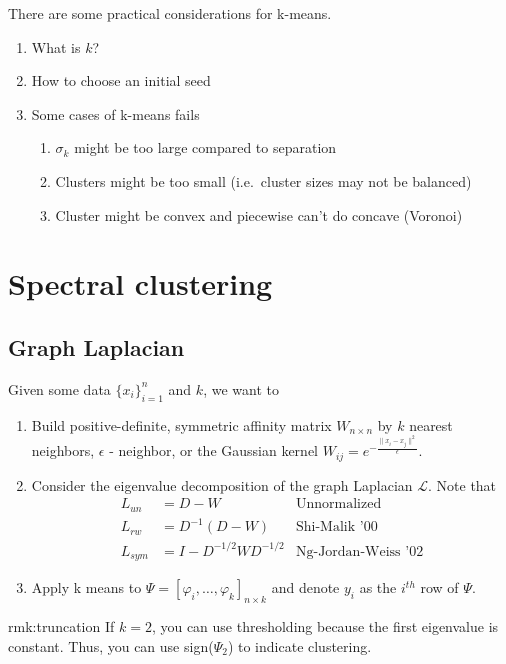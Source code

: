 \documentclass[12pt]{article}
\theoremstyle{plain}
\begin{document}
There are some practical considerations for k-means.
\begin{enumerate}
  \item What is $ k $?
  \item How to choose an initial seed
  \item Some cases of k-means fails
  \begin{enumerate}
    \item $ \sigma_k $ might be too large compared to separation
    \item Clusters might be too small (i.e.\ cluster sizes may not be balanced)
    \item Cluster might be convex and piecewise can't do concave (Voronoi)
  \end{enumerate}
\end{enumerate}

\section{Spectral clustering}
\label{sec:spectral}

\subsection{Graph Laplacian}

Given some data $ \{ x_i \}_{i = 1}^n $ and $ k $, we want to
\begin{enumerate}
  \item Build positive-definite, symmetric affinity matrix $ W_{n \times n} $ by $ k $ nearest neighbors, $ \epsilon $ - neighbor, or the Gaussian kernel $ W_{ij} = e^{- \frac{\| x_i - x_j \|^2}{\epsilon}} $.
  \item Consider the eigenvalue decomposition of the graph Laplacian $ \mathcal{L} $.
  Note that
  \begin{align*}
    L_{un} &= D - W  & \text{Unnormalized} \\
    L_{rw} &= D^{-1} (D - W) & \text{Shi-Malik '00} \\
    L_{sym} &= I - D^{-1/2} W D^{-1/2} & \text{Ng-Jordan-Weiss '02}
  \end{align*}
  \item Apply k means to $ \Psi = [\varphi_i, \ldots, \varphi_k]_{n \times k} $ and denote $ y_i $ as the $ i^{th} $ row of $ \Psi $.
\end{enumerate}

\begin{rmk}[Thresholding]{rmk:truncation}
  If $ k = 2$, you can use thresholding because the first eigenvalue is constant. Thus, you can use sign($\Psi_2$) to indicate clustering.
\end{rmk}
\end{document}
